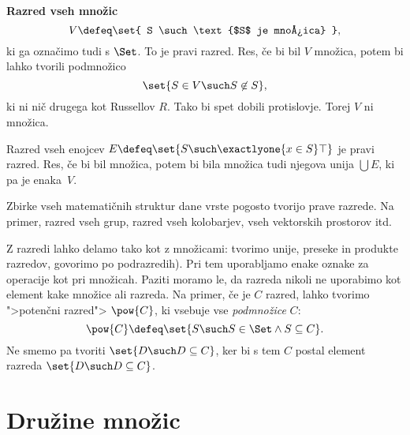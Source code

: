 \begin{primer}
  \textbf{Razred vseh množic}
  \begin{equation*}
    V \defeq \set{ S \such \text{$S$ je množica} },
  \end{equation*}
% 
  ki ga označimo tudi s $\Set$. To je pravi razred. Res, če bi bil $V$ množica,
  potem bi lahko tvorili podmnožico
  \begin{equation*}
    \set{ S \in V \such S \not\in S},
  \end{equation*}
  ki ni nič drugega kot Russellov $R$. Tako bi spet dobili protislovje. Torej $V$
  ni množica.
\end{primer}

\begin{primer}
  Razred vseh enojcev $E \defeq \set{ S \such \exactlyone{x \in S} \top }$ je pravi razred. Res, če bi bil množica, potem bi bila množica tudi njegova unija $\bigcup E$, ki pa je enaka~$V$.
\end{primer}

\begin{primer}
  Zbirke vseh matematičnih struktur dane vrste pogosto tvorijo prave razrede. Na primer, razred vseh grup, razred vseh kolobarjev, vseh vektorskih prostorov itd.
\end{primer}

Z razredi lahko delamo tako kot z množicami: tvorimo unije, preseke in produkte
razredov, govorimo po podrazredih). Pri tem uporabljamo enake oznake za
operacije kot pri množicah. Paziti moramo le, da razreda nikoli ne uporabimo kot
element kake množice ali razreda. Na primer, če je $C$ razred, lahko tvorimo
">potenčni razred"> $\pow{C}$, ki vsebuje vse \emph{podmnožice} $C$:
\begin{equation*}
    \pow{C} \defeq \set{ S \such S \in \Set \land S \subseteq C }.
\end{equation*}
%
Ne smemo pa tvoriti $\set{ D \such D \subseteq C }$, ker bi s tem $C$ postal element razreda $\set{D \such D \subseteq C}$.

\section{Družine množic}

